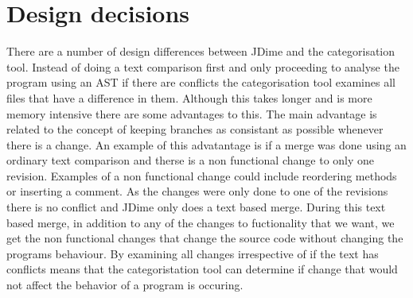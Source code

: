 

% 

\section{Design decisions}

There are a number of design differences between JDime and the categorisation tool.  Instead of doing a text comparison first and only proceeding to analyse the program using an AST if there are conflicts the categorisation tool examines all files that have a difference in them.  Although this takes longer and is more memory intensive there are some advantages to this. The main advantage is related to the concept of keeping branches as consistant as possible whenever there is a change. An example of this advatantage is if a merge was done using an ordinary text comparison and therse is a non functional change to only one revision. Examples of a non functional change could include reordering methods or inserting a comment.  As the changes were only done to one of the revisions there is no conflict and JDime only does a text based merge.  During this text based merge, in addition to any of the changes to fuctionality that we want, we get the non functional changes that change the source code without changing the programs behaviour. By examining all changes irrespective of if the text has conflicts means that the categoristation tool can determine if change that would not affect the behavior of a program is occuring.


